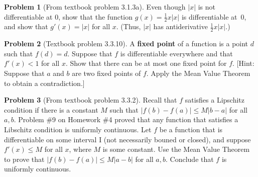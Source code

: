 \documentclass[12pt]{article}
\theoremstyle{definition}
\newtheorem{problem}{Problem}
\newenvironment{answer}{\par\medskip\bgroup\color{darkblue}}{\egroup\medskip}
\begin{document}
\begin{answer}
\end{answer}



\begin{problem}  %
[From textbook problem 3.1.3a]
Even though $|x|$ is not differentiable at 0, show that the function $g(x)=\frac{1}{2}x|x|$ is
differentiable at~0, and show that $g'(x)=|x|$ for all $x$.  (Thus, $|x|$ has antiderivative
$\frac{1}{2}x|x|$.)
\end{problem}

\begin{answer}
\end{answer}



\begin{problem}  %
[Textbook problem 3.3.10]
A \textbf{fixed point} of a function is a point $d$ such that $f(d)=d$.  Suppose that
$f$ is differentiable everywhere and that $f'(x)<1$ for all $x$.  Show that there can
be at most one fixed point for $f$. [Hint:  Suppose that $a$ and $b$ are two fixed points of $f$.
Apply the Mean Value Theorem to obtain a contradiction.]
\end{problem}

\begin{answer}
\end{answer}



\begin{problem} %
[From textbook problem 3.3.2]
Recall that $f$ satisfies a Lipschitz condition if there is a constant $M$ such that
$|f(b)-f(a)|\le M|b-a|$ for all $a,b$.  Problem \#9 on Homework \#4 proved that
any function that satisfies a Libschitz condition is uniformly continuous.
Let $f$ be a function that is differentiable on some interval I (not necessarily bouned or closed),
and suppose $f'(x)\le M$ for all $x$, where $M$ is some constant.  Use the 
Mean Value Theorem to prove that $|f(b)-f(a)|\le M|a-b|$ for all $a,b$.
Conclude that $f$ is uniformly continuous.
\end{problem}

\begin{answer}
\end{answer}
\end{document}
